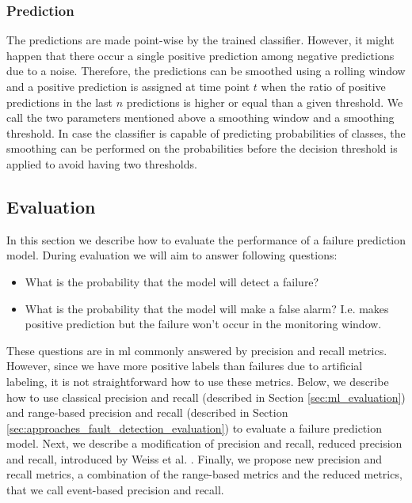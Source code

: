 \subsubsection{Prediction}

The predictions are made point-wise by the trained classifier.
However, it might happen that there occur a single positive prediction among negative predictions due to a noise.
Therefore, the predictions can be smoothed using a rolling window and a positive prediction is assigned at time point $t$ when the ratio of positive predictions in the last $n$ predictions is higher  or equal than a given threshold.
We call the two parameters mentioned above a smoothing window and a smoothing threshold.
In case the classifier is capable of predicting probabilities of classes, the smoothing can be performed on the probabilities before the decision threshold is applied to avoid having two thresholds.

\subsection{Evaluation}
\label{sec:approaches_failure_prediction_evaluation}

In this section we describe how to evaluate the performance of a failure prediction model.
During evaluation we will aim to answer following questions:
\begin{itemize}
    \item What is the probability that the model will detect a failure?
    \item What is the probability that the model will make a false alarm? I.e. makes positive prediction but the failure won't occur in the monitoring window.
\end{itemize}
These questions are in \acrshort{ml} commonly answered by precision and recall metrics.
However, since we have more positive labels than failures due to artificial labeling, it is not straightforward how to use these metrics.
Below, we describe how to use classical precision and recall (described in Section \ref{sec:ml_evaluation}) and range-based precision and recall (described in Section \ref{sec:approaches_fault_detection_evaluation}) to evaluate a failure prediction model.
Next, we describe a modification of precision and recall, reduced precision and recall, introduced by Weiss et al. \cite{weiss1998learning}.
Finally, we propose new precision and recall metrics, a combination of the range-based metrics and the reduced metrics, that we call event-based precision and recall.


